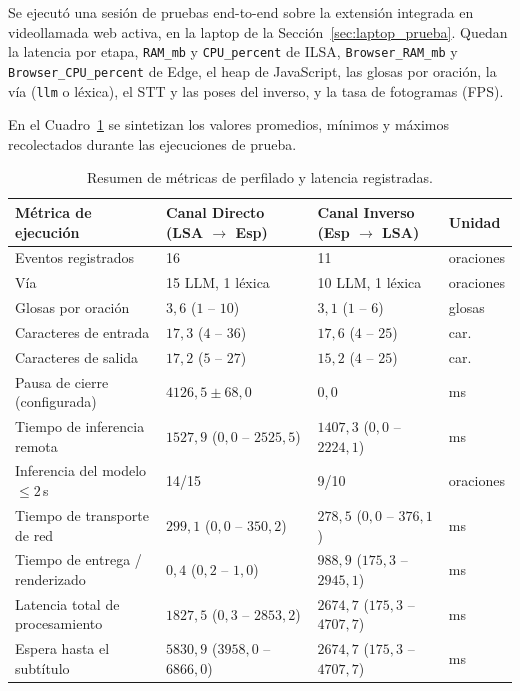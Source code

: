 Se ejecutó una sesión de pruebas end-to-end sobre la extensión integrada en videollamada web activa, en la laptop de la Sección~\ref{sec:laptop_prueba}. Quedan la latencia por etapa, \texttt{RAM\_mb} y \texttt{CPU\_percent} de ILSA, \texttt{Browser\_RAM\_mb} y \texttt{Browser\_CPU\_percent} de Edge, el heap de JavaScript, las glosas por oración, la vía (\texttt{llm} o léxica), el STT y las poses del inverso, y la tasa de fotogramas (FPS).

En el Cuadro~\ref{tab:telemetria_resumen} se sintetizan los valores promedios, mínimos y máximos recolectados durante las ejecuciones de prueba.

\begin{table}[H]
\centering
\small
\caption{Resumen de métricas de perfilado y latencia registradas.}
\label{tab:telemetria_resumen}
\begin{tabularx}{\textwidth}{l X X X}
\toprule
\textbf{Métrica de ejecución} & \textbf{Canal Directo (LSA $\rightarrow$ Esp)} & \textbf{Canal Inverso (Esp $\rightarrow$ LSA)} & \textbf{Unidad} \\
\midrule
Eventos registrados & 16 & 11 & oraciones \\
Vía & 15 LLM, 1 léxica & 10 LLM, 1 léxica & oraciones \\
Glosas por oración & $3{,}6$ ($1$ -- $10$) & $3{,}1$ ($1$ -- $6$) & glosas \\
Caracteres de entrada & $17{,}3$ ($4$ -- $36$) & $17{,}6$ ($4$ -- $25$) & car. \\
Caracteres de salida & $17{,}2$ ($5$ -- $27$) & $15{,}2$ ($4$ -- $25$) & car. \\
Pausa de cierre (configurada) & $4126{,}5 \pm 68{,}0$ & $0{,}0$ & ms \\
Tiempo de inferencia remota & $1527{,}9$ ($0{,}0$ -- $2525{,}5$) & $1407{,}3$ ($0{,}0$ -- $2224{,}1$) & ms \\
Inferencia del modelo $\le 2$\,s & 14/15 & 9/10 & oraciones \\
Tiempo de transporte de red & $299{,}1$ ($0{,}0$ -- $350{,}2$) & $278{,}5$ ($0{,}0$ -- $376{,}1$) & ms \\
Tiempo de entrega / renderizado & $0{,}4$ ($0{,}2$ -- $1{,}0$) & $988{,}9$ ($175{,}3$ -- $2945{,}1$) & ms \\
Latencia total de procesamiento & $1827{,}5$ ($0{,}3$ -- $2853{,}2$) & $2674{,}7$ ($175{,}3$ -- $4707{,}7$) & ms \\
Espera hasta el subtítulo & $5830{,}9$ ($3958{,}0$ -- $6866{,}0$) & $2674{,}7$ ($175{,}3$ -- $4707{,}7$) & ms \\

\end{tabularx}
\end{table}
